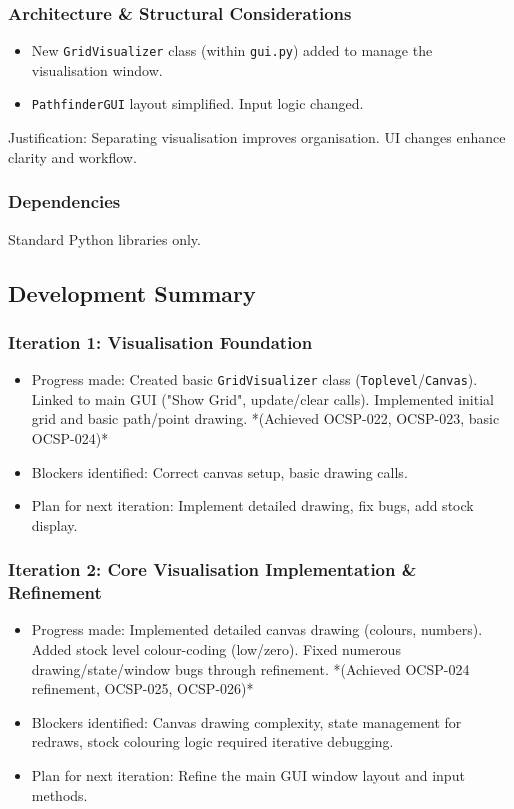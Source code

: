 \subsubsection{Architecture \& Structural Considerations}
\begin{itemize}
	\item New \verb|GridVisualizer| class (within \verb|gui.py|) added to manage the visualisation window.
	\item \verb|PathfinderGUI| layout simplified. Input logic changed.
\end{itemize}
Justification: Separating visualisation improves organisation. UI changes enhance clarity and workflow.

\subsubsection{Dependencies}
Standard Python libraries only.

\newpage
\subsection{Development Summary}

\subsubsection{Iteration 1: Visualisation Foundation}
\begin{itemize}
	\item Progress made: Created basic \verb|GridVisualizer| class (\verb|Toplevel|/\verb|Canvas|). Linked to main GUI ("Show Grid", update/clear calls). Implemented initial grid and basic path/point drawing. *(Achieved OCSP-022, OCSP-023, basic OCSP-024)*
	\item Blockers identified: Correct canvas setup, basic drawing calls.
	\item Plan for next iteration: Implement detailed drawing, fix bugs, add stock display.
\end{itemize}

\subsubsection{Iteration 2: Core Visualisation Implementation \& Refinement}
\begin{itemize}
	\item Progress made: Implemented detailed canvas drawing (colours, numbers). Added stock level colour-coding (low/zero). Fixed numerous drawing/state/window bugs through refinement. *(Achieved OCSP-024 refinement, OCSP-025, OCSP-026)*
	\item Blockers identified: Canvas drawing complexity, state management for redraws, stock colouring logic required iterative debugging.
	\item Plan for next iteration: Refine the main GUI window layout and input methods.
\end{itemize}


